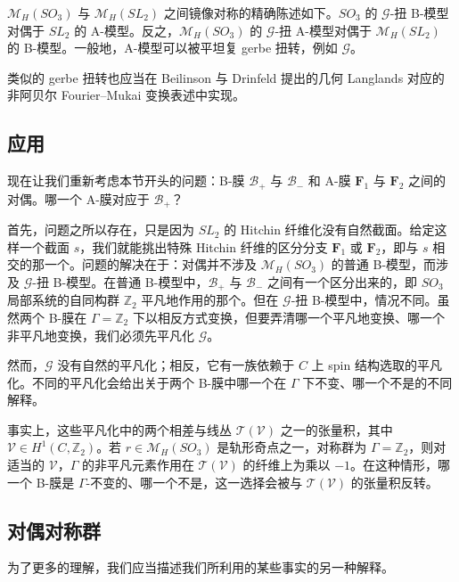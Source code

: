 
$\mathcal{M}_H(SO_3)$ 与 $\mathcal{M}_H(SL_2)$ 之间镜像对称的精确陈述如下。$SO_3$ 的 $\mathcal{G}$-扭 B-模型对偶于 $SL_2$ 的 A-模型。反之，$\mathcal{M}_H(SO_3)$ 的 $\mathcal{G}$-扭 A-模型对偶于 $\mathcal{M}_H(SL_2)$ 的 B-模型。一般地，A-模型可以被平坦复 gerbe 扭转，例如 $\mathcal{G}$。

类似的 gerbe 扭转也应当在 Beilinson 与 Drinfeld 提出的几何 Langlands 对应的非阿贝尔 Fourier--Mukai 变换表述中实现。

\subsection{应用}

现在让我们重新考虑本节开头的问题：B-膜 $\mathcal{B}_+$ 与 $\mathcal{B}_-$ 和 A-膜 $\boldsymbol{F}_1$ 与 $\boldsymbol{F}_2$ 之间的对偶。哪一个 A-膜对应于 $\mathcal{B}_+$？

首先，问题之所以存在，只是因为 $SL_2$ 的 Hitchin 纤维化没有自然截面。给定这样一个截面 $s$，我们就能挑出特殊 Hitchin 纤维的区分分支 $\boldsymbol{F}_1$ 或 $\boldsymbol{F}_2$，即与 $s$ 相交的那一个。问题的解决在于：对偶并不涉及 $\mathcal{M}_H(SO_3)$ 的普通 B-模型，而涉及 $\mathcal{G}$-扭 B-模型。在普通 B-模型中，$\mathcal{B}_+$ 与 $\mathcal{B}_-$ 之间有一个区分出来的，即 $SO_3$ 局部系统的自同构群 $\mathbb{Z}_2$ 平凡地作用的那个。但在 $\mathcal{G}$-扭 B-模型中，情况不同。虽然两个 B-膜在 $\Gamma=\mathbb{Z}_2$ 下以相反方式变换，但要弄清哪一个平凡地变换、哪一个非平凡地变换，我们必须先平凡化 $\mathcal{G}$。

然而，$\mathcal{G}$ 没有自然的平凡化；相反，它有一族依赖于 $C$ 上 spin 结构选取的平凡化。不同的平凡化会给出关于两个 B-膜中哪一个在 $\Gamma$ 下不变、哪一个不是的不同解释。

事实上，这些平凡化中的两个相差与线丛 $\mathcal{T}(\mathcal{V})$ 之一的张量积，其中 $\mathcal{V}\in H^1(C,\mathbb{Z}_2)$。若 $r\in\mathcal{M}_H(SO_3)$ 是轨形奇点之一，对称群为 $\Gamma=\mathbb{Z}_2$，则对适当的 $\mathcal{V}$，$\Gamma$ 的非平凡元素作用在 $\mathcal{T}(\mathcal{V})$ 的纤维上为乘以 $-1$。在这种情形，哪一个 B-膜是 $\Gamma$-不变的、哪一个不是，这一选择会被与 $\mathcal{T}(\mathcal{V})$ 的张量积反转。

\subsection{对偶对称群}

为了更多的理解，我们应当描述我们所利用的某些事实的另一种解释。

